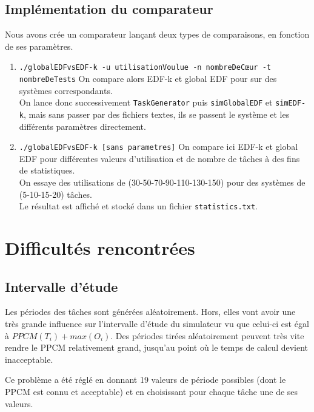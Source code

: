 \documentclass[a4paper,10pt]{article}
\begin{document}
	\subsection{Implémentation du comparateur}
		Nous avons crée un comparateur lançant deux types de comparaisons, en fonction de ses paramètres.
		\begin{enumerate}
			\item \verb?./globalEDFvsEDF-k -u utilisationVoulue -n nombreDeCœur -t nombreDeTests?
					On compare alors EDF-k et global EDF pour sur des systèmes correspondants.\\
					On lance donc successivement \verb?TaskGenerator? puis \verb?simGlobalEDF? et \verb?simEDF-k?, mais sans passer par des fichiers textes, ils se passent le système et les différents paramètres directement.
			\item \verb?./globalEDFvsEDF-k [sans parametres]?
					On compare ici EDF-k et global EDF pour différentes valeurs d'utilisation et de nombre de tâches à des fins de statistiques.\\
					On essaye des utilisations de (30-50-70-90-110-130-150) pour des systèmes de (5-10-15-20) tâches.\\
					Le résultat est affiché et stocké dans un fichier \verb?statistics.txt?.
		\end{enumerate}
		
		
\section{Difficultés rencontrées}

	\subsection{Intervalle d'étude}

		Les périodes des tâches sont générées aléatoirement. Hors, elles vont avoir une très grande influence sur l'intervalle d'étude du simulateur vu que 		celui-ci est égal à $PPCM(T_i)+ max(O_i)$. Des périodes tirées aléatoirement peuvent très vite rendre le PPCM relativement grand, jusqu'au point où 		le temps de calcul devient inacceptable.

		Ce problème a été réglé en donnant 19 valeurs de période possibles (dont le PPCM est connu et acceptable) et en choisissant pour chaque tâche une 			de ses valeurs.\\
\end{document}
